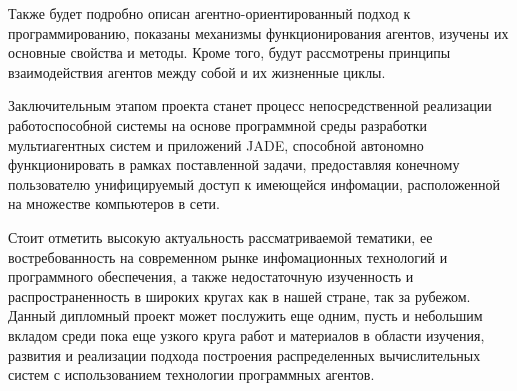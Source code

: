 Также будет подробно описан агентно-ориентированный подход к программированию, показаны механизмы функционирования агентов, изучены их основные свойства и методы. Кроме того, будут рассмотрены принципы взаимодействия агентов между собой и их жизненные циклы.

Заключительным этапом проекта станет процесс непосредственной реализации работоспособной системы на основе программной среды разработки мультиагентных систем и приложений JADE, способной автономно функционировать в рамках поставленной задачи, предоставляя конечному пользователю унифицируемый доступ к имеющейся инфомации, расположенной на множестве компьютеров в сети.

Стоит отметить высокую актуальность рассматриваемой тематики, ее востребованность на современном рынке инфомационных технологий и программного обеспечения, а также недостаточную изученность и распространенность в широких кругах как в нашей стране, так за рубежом. Данный дипломный проект может послужить еще одним, пусть и небольшим вкладом среди пока еще узкого круга работ и материалов в области изучения, развития и реализации подхода построения распределенных вычислительных систем с использованием технологии программных агентов.
